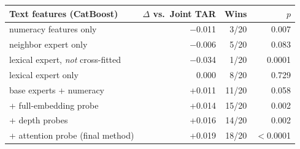 \begin{tabular}{lrrr}
\toprule
Text features (CatBoost) & $\Delta$ vs.\ Joint TAR & Wins & $p$ \\
\midrule
numeracy features only & $-$0.011 & 3/20 & 0.007 \\
neighbor expert only & $-$0.006 & 5/20 & 0.083 \\
lexical expert, \emph{not} cross-fitted & $-$0.034 & 1/20 & 0.0001 \\
lexical expert only & 0.000 & 8/20 & 0.729 \\
base experts + numeracy & +0.011 & 11/20 & 0.058 \\
+ full-embedding probe & +0.014 & 15/20 & 0.002 \\
+ depth probes & +0.016 & 14/20 & 0.002 \\
+ attention probe (final method) & +0.019 & 18/20 & $<$0.0001 \\
\bottomrule
\end{tabular}
